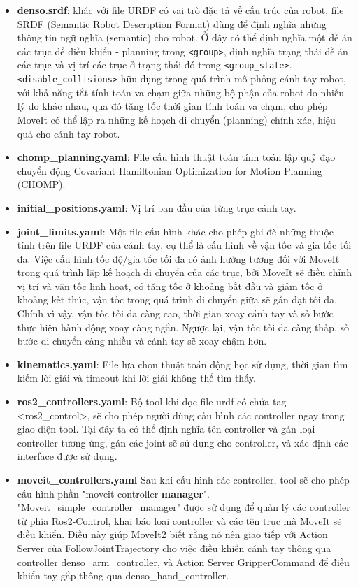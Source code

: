 \begin{itemize}
    \item \textbf{denso.srdf}: khác với file URDF có vai trò đặc tả về cấu trúc của robot, file SRDF (Semantic Robot Description Format) dùng để định nghĩa những thông tin ngữ nghĩa (semantic) cho robot. Ở đây có thể định nghĩa một đề án các trục để điều khiển - planning trong \lstinline[style=inlinecode]{<group>}, định nghĩa trạng thái đề án các trục và vị trí các trục ở trạng thái đó trong \lstinline[style=inlinecode]{<group_state>}. \lstinline[style=inlinecode]{<disable_collisions>} hữu dụng trong quá trình mô phỏng cánh tay robot, với khả năng tắt tính toán va chạm giữa những bộ phận của robot do nhiều lý do khác nhau, qua đó tăng tốc thời gian tính toán va chạm, cho phép MoveIt có thể lập ra những kế hoạch di chuyển (planning) chính xác, hiệu quả cho cánh tay robot.
    \item \textbf{chomp\_planning.yaml}: File cấu hình thuật toán tính toán lập quỹ đạo chuyển động Covariant Hamiltonian Optimization for Motion Planning (CHOMP). 
    \item \textbf{initial\_positions.yaml}: Vị trí ban đầu của từng trục cánh tay.
    \item \textbf{joint\_limits.yaml}: Một file cấu hình khác cho phép ghi đè những thuộc tính trên file URDF của cánh tay, cụ thể là cấu hình về vận tốc và gia tốc tối đa. Việc cấu hình tốc độ/gia tốc tối đa có ảnh hưởng tương đối với MoveIt trong quá trình lập kế hoạch di chuyển của các trục, bởi MoveIt sẽ điều chỉnh vị trí và vận tốc linh hoạt, có tăng tốc ở khoảng bắt đầu và giảm tốc ở khoảng kết thúc, vận tốc trong quá trình di chuyển giữa sẽ gần đạt tối đa. Chính vì vậy, vận tốc tối đa càng cao, thời gian xoay cánh tay và số bước thực hiện hành động xoay càng ngắn. Ngược lại, vận tốc tối đa càng thấp, số bước di chuyển càng nhiều và cánh tay sẽ xoay chậm hơn.
    \item \textbf{kinematics.yaml}: File lựa chọn thuật toán động học sử dụng, thời gian tìm kiếm lời giải và timeout khi lời giải không thể tìm thấy.
    \item \textbf{ros2\_controllers.yaml}: Bộ tool khi đọc file urdf có chứa tag <ros2\_control>, sẽ cho phép người dùng cấu hình các controller ngay trong giao diện tool. Tại đây ta có thể định nghĩa tên controller và gán loại controller tương ứng, gán các joint sẽ sử dụng cho controller, và xác định các interface được sử dụng. 
    \item \textbf{moveit\_controllers.yaml} Sau khi cấu hình các controller, tool sẽ cho phép cấu hình phần "moveit controller \textbf{manager}". "Moveit\_simple\_controller\_manager" được sử dụng để quản lý các controller từ phía Ros2-Control, khai báo loại controller và các tên trục mà MoveIt sẽ điều khiển. Điều này giúp MoveIt2 biết rằng nó nên giao tiếp với Action Server của FollowJointTrajectory cho việc điều khiển cánh tay thông qua controller denso\_arm\_controller, và Action Server GripperCommand để điều khiển tay gắp thông qua denso\_hand\_controller.
\end{itemize}

